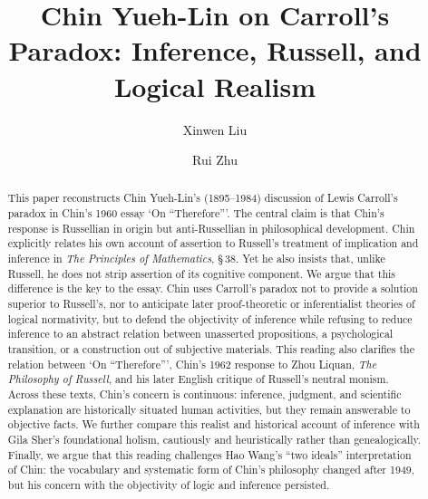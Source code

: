 \documentclass{birkjour}
\begin{document}
\title{Chin Yueh-Lin on Carroll's Paradox: Inference, Russell, and Logical Realism}
\author{Xinwen Liu}
\address{%
Institute of Philosophy, Chinese Academy of Social Sciences\\
Beijing 100732\\
PRC}

\author{Rui Zhu}
\address{%
Level 3, Unit 16, Datang Hydropower Plant\\
West Triangle, Chengguan Town\\
Shiquan County, Shaanxi Province\\
PRC}

\date{}

\begin{abstract}
This paper reconstructs Chin Yueh-Lin's (1895--1984) discussion of Lewis Carroll's paradox in Chin's 1960 essay `On ``Therefore'''. The central claim is that Chin's response is Russellian in origin but anti-Russellian in philosophical development. Chin explicitly relates his own account of assertion to Russell's treatment of implication and inference in \textit{The Principles of Mathematics}, \S\,38. Yet he also insists that, unlike Russell, he does not strip assertion of its cognitive component. We argue that this difference is the key to the essay. Chin uses Carroll's paradox not to provide a solution superior to Russell's, nor to anticipate later proof-theoretic or inferentialist theories of logical normativity, but to defend the objectivity of inference while refusing to reduce inference to an abstract relation between unasserted propositions, a psychological transition, or a construction out of subjective materials. This reading also clarifies the relation between `On ``Therefore''', Chin's 1962 response to Zhou Liquan, \textit{The Philosophy of Russell}, and his later English critique of Russell's neutral monism. Across these texts, Chin's concern is continuous: inference, judgment, and scientific explanation are historically situated human activities, but they remain answerable to objective facts. We further compare this realist and historical account of inference with Gila Sher's foundational holism, cautiously and heuristically rather than genealogically. Finally, we argue that this reading challenges Hao Wang's ``two ideals'' interpretation of Chin: the vocabulary and systematic form of Chin's philosophy changed after 1949, but his concern with the objectivity of logic and inference persisted.
\end{abstract}
\maketitle
\end{document}
